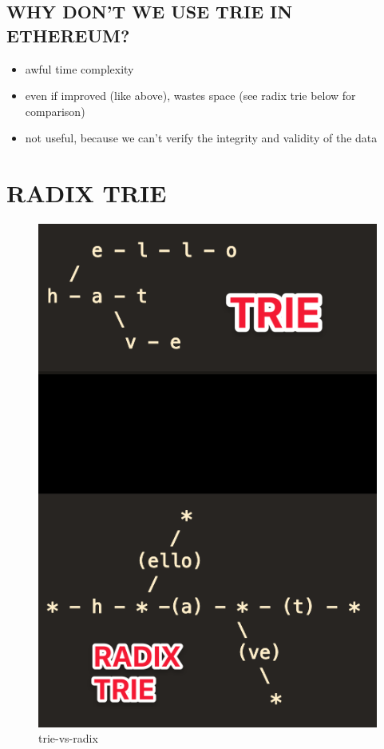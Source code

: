 \documentclass[11pt]{article}
\providecommand{\tightlist}{%
      \setlength{\itemsep}{0pt}\setlength{\parskip}{0pt}}
\begin{document}
    \hypertarget{why-dont-we-use-trie-in-ethereum}{%
\subsection{WHY DON'T WE USE TRIE IN
ETHEREUM?}\label{why-dont-we-use-trie-in-ethereum}}

\begin{itemize}
\tightlist
\item
  awful time complexity
\item
  even if improved (like above), wastes space (see radix trie below for
  comparison)
\item
  not useful, because we can't verify the integrity and validity of the
  data
\end{itemize}

    \hypertarget{radix-trie}{%
\section{RADIX TRIE}\label{radix-trie}}

    \begin{figure}
\centering
\includegraphics{../static/trie-vs-radix.png}
\caption{trie-vs-radix}
\end{figure}
\end{document}
